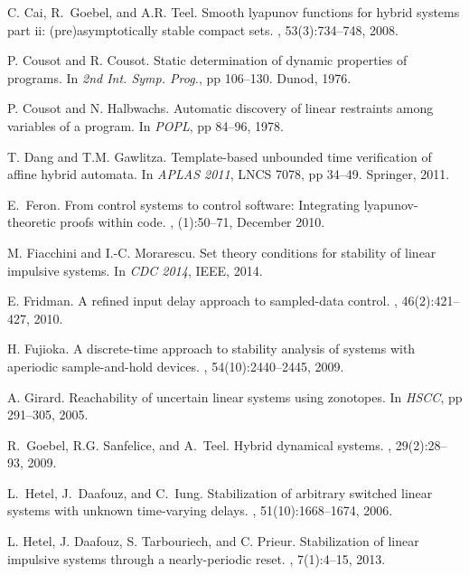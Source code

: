 \begin{thebibliography}{10}
C. Cai, R.~Goebel, and A.R. Teel.
\newblock Smooth lyapunov functions for hybrid systems part ii:
  (pre)asymptotically stable compact sets.
, 53(3):734--748, 2008.

P. Cousot and R. Cousot.
\newblock Static determination of dynamic properties of programs.
\newblock In {\em 2nd Int. Symp. Prog.}, pp 106--130. Dunod, 1976.

P. Cousot and N. Halbwachs.
\newblock Automatic discovery of linear restraints among variables of a
  program.
\newblock In {\em POPL}, pp 84--96, 1978.

T. Dang and T.M. Gawlitza.
\newblock Template-based unbounded time verification of affine hybrid automata.
\newblock In {\em APLAS 2011}, LNCS 7078, pp 34--49. Springer, 2011.

E.~Feron.
\newblock From control systems to control software: Integrating
  lyapunov-theoretic proofs within code.
, (1):50--71, December 2010.

M. Fiacchini and I.-C. Morarescu.
\newblock Set theory conditions for stability of linear impulsive systems.
\newblock In {\em CDC 2014}, IEEE, 2014.

E. Fridman.
\newblock A refined input delay approach to sampled-data control.
, 46(2):421--427, 2010.

H. Fujioka.
\newblock A discrete-time approach to stability analysis of systems with
  aperiodic sample-and-hold devices.
, 54(10):2440--2445,
  2009.

A. Girard.
\newblock Reachability of uncertain linear systems using zonotopes.
\newblock In {\em HSCC}, pp 291--305, 2005.

R.~Goebel, R.G. Sanfelice, and A.~Teel.
\newblock Hybrid dynamical systems.
, 29(2):28--93, 2009.

L.~Hetel, J.~Daafouz, and C.~Iung.
\newblock Stabilization of arbitrary switched linear systems with unknown
  time-varying delays.
, 51(10):1668--1674,
  2006.

L. Hetel, J. Daafouz, S. Tarbouriech, and C. Prieur.
\newblock Stabilization of linear impulsive systems through a nearly-periodic
  reset.
, 7(1):4--15, 2013.


\end{thebibliography}
